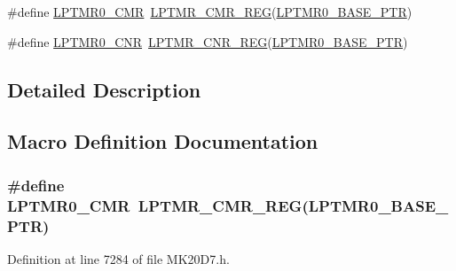 \begin{DoxyCompactItemize}
\item 
\#define \hyperlink{group___l_p_t_m_r___register___accessor___macros_gac109508795b1b22820940313ddb4c620}{L\+P\+T\+M\+R0\+\_\+\+C\+MR}~\hyperlink{group___l_p_t_m_r___register___accessor___macros_ga7a7ca80913d5f4e2ceed4be05272267a}{L\+P\+T\+M\+R\+\_\+\+C\+M\+R\+\_\+\+R\+EG}(\hyperlink{group___l_p_t_m_r___peripheral_ga90a9194151ad11b422bcab162e797eda}{L\+P\+T\+M\+R0\+\_\+\+B\+A\+S\+E\+\_\+\+P\+TR})
\item 
\#define \hyperlink{group___l_p_t_m_r___register___accessor___macros_gada9bf6b3d564321571ac27faa4d263ad}{L\+P\+T\+M\+R0\+\_\+\+C\+NR}~\hyperlink{group___l_p_t_m_r___register___accessor___macros_gac2f4b2b992990404896f3b23f4d666cb}{L\+P\+T\+M\+R\+\_\+\+C\+N\+R\+\_\+\+R\+EG}(\hyperlink{group___l_p_t_m_r___peripheral_ga90a9194151ad11b422bcab162e797eda}{L\+P\+T\+M\+R0\+\_\+\+B\+A\+S\+E\+\_\+\+P\+TR})
\end{DoxyCompactItemize}


\subsection{Detailed Description}


\subsection{Macro Definition Documentation}
\subsubsection[{\texorpdfstring{L\+P\+T\+M\+R0\+\_\+\+C\+MR}{LPTMR0_CMR}}]{\setlength{\rightskip}{0pt plus 5cm}\#define L\+P\+T\+M\+R0\+\_\+\+C\+MR~{\bf L\+P\+T\+M\+R\+\_\+\+C\+M\+R\+\_\+\+R\+EG}({\bf L\+P\+T\+M\+R0\+\_\+\+B\+A\+S\+E\+\_\+\+P\+TR})}\hypertarget{group___l_p_t_m_r___register___accessor___macros_gac109508795b1b22820940313ddb4c620}{}\label{group___l_p_t_m_r___register___accessor___macros_gac109508795b1b22820940313ddb4c620}


Definition at line 7284 of file M\+K20\+D7.\+h.

